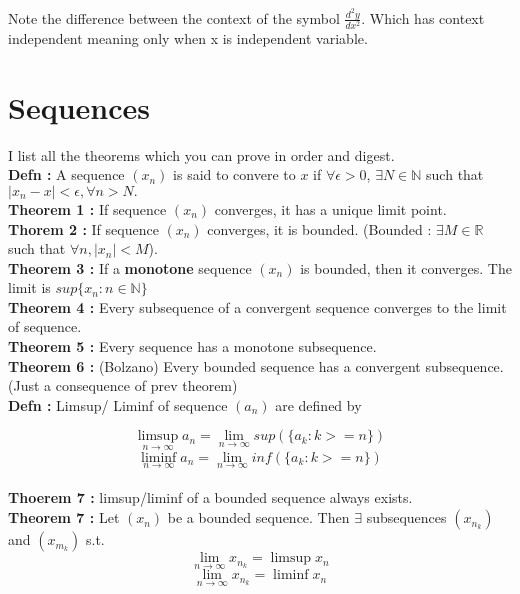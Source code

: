 \documentclass{report}
\begin{document}
\noindent Note the difference between the context of the symbol $\frac{d^2 y}{dx^2}$. Which has context independent meaning only when x is independent variable.

\chapter{Sequences}
I list all the theorems which you can prove in order and digest.\\

\noindent\textbf{Defn :} A sequence $(x_n)$ is said to convere to $x$ if $\forall \epsilon > 0$, $\exists N\in \mathbb{N}$ such that $|x_n - x| < \epsilon, \forall n > N.$ \\

\noindent \textbf{Theorem 1 :} If sequence $(x_n)$ converges, it has a unique limit point.\\

\noindent \textbf{Thorem 2 :} If sequence $(x_n)$ converges, it is bounded. (Bounded : $\exists M \in \mathbb{R}$ such that $\forall n,  |x_n| < M$).\\

\noindent \textbf{Theorem 3 :} If a \textbf{monotone} sequence $(x_n)$ is bounded, then it converges. The limit is $sup\{x_n : n \in \mathbb{N}\}$ \\

\noindent \textbf{Theorem 4 :} Every subsequence of a convergent sequence converges to the limit of sequence.\\

\noindent \textbf{Theorem 5 :} Every sequence has a monotone subsequence.\\

\noindent \textbf{Theorem 6 :} (Bolzano) Every bounded sequence has a convergent subsequence. (Just a consequence of prev theorem)\\

\noindent \textbf{Defn :} Limsup/ Liminf of sequence $(a_n)$ are defined by 

$$\limsup_{n\to\infty} a_n = \lim_{n\to\infty}sup(\{a_k : k>=n\})$$ 
$$\liminf_{n\to\infty} a_n = \lim_{n\to\infty}inf(\{a_k : k>=n\})$$ \\

\noindent \textbf{Thoerem 7 :} limsup/liminf of a bounded sequence always exists.\\

\noindent \textbf{Theorem 7 :} Let $(x_n)$ be a bounded sequence. Then $\exists$ subsequences $(x_{n_k})$ and $(x_{m_k})$ s.t.
$$\lim_{n\to\infty}x_{n_k} = \limsup x_n$$
$$\lim_{n\to\infty}x_{n_k} = \liminf x_n$$
\end{document}
